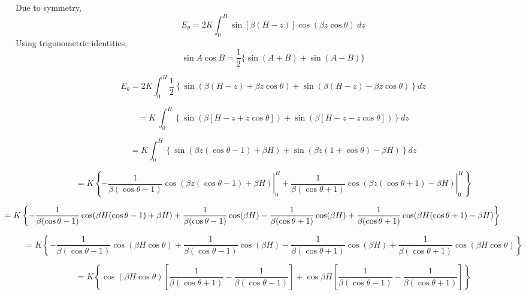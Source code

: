 Due to symmetry,$$ E_\theta = 2K\int^H_0\sin[\beta(H - z)]\cos(\beta z\cos\theta)\ dz $$
Using trigonometric identities,\\
$$
\sin A\cos B = \dfrac{1}{2}\{\sin(A + B) + \sin(A - B)\}
$$


\begin{dmath*}
	E_{\theta} =2K\int_{0}^{H} \dfrac{1}{2}\left\lbrace\sin(\beta(H-z) +\beta z\cos \theta) + \sin(\beta(H-z) - \beta z\cos \theta) \right\rbrace dz
\end{dmath*}

\begin{dmath*}
	=K\ \int_{0}^{H}\left\lbrace\sin(\beta[H-z+z\cos \theta]) + \sin(\beta[H-z-z\cos \theta])\right \rbrace dz
\end{dmath*}

\begin{dmath*}
	=K\int_{0}^{H}\left\lbrace\sin(\beta z(\cos \theta -1) + \beta H)+ {\sin(\beta z(1 + \cos \theta) - \beta H)}\right\rbrace dz
\end{dmath*}

\begin{dmath*}
	=K\left\lbrace \left.-\dfrac{1}{\beta(\cos\theta -1)} \cos(\beta z(\cos\theta -1) + \beta H) \right|_{0}^{H} +\left. \dfrac{1}{\beta(\cos \theta + 1)} \cos(\beta z(\cos\theta + 1) - \beta H)\right|_{0}^{H} \right\rbrace
\end{dmath*}

\begin{dmath*}
	\hspace{-50pt}=K\left\lbrace-\dfrac{1}{\beta(\cos\theta -1)} \cos(\beta H(\cos\theta -1) + \beta H) + \dfrac{1}{\beta(\cos\theta -1)} \cos(\beta H) - \dfrac{1}{\beta(\cos\theta + 1)} \cos(\beta H) +\dfrac{1}{\beta(\cos\theta + 1)} \cos(\beta H(\cos\theta + 1) -\beta H)\right\rbrace
\end{dmath*}

\begin{dmath*}
	=K\left\lbrace -\dfrac{1}{\beta(\cos \theta -1)} \cos(\beta H \cos\theta) + \dfrac{1}{\beta(\cos\theta - 1)} \cos(\beta H) - \dfrac{1}{\beta(\cos\theta + 1)} \cos(\beta H) + \dfrac{1}{\beta(\cos\theta + 1)} \cos(\beta H \cos\theta)\right\rbrace
\end{dmath*}

\begin{dmath*}
	=K\left\lbrace\cos(\beta H\cos \theta)\left[\dfrac{1}{\beta(\cos \theta + 1)}- \dfrac{1}{\beta(\cos\theta - 1)}\right] + \cos \beta H\left[\dfrac{1}{\beta(\cos\theta  - 1)} - \dfrac{1}{\beta(\cos\theta + 1)}\right]\right\rbrace
\end{dmath*}

